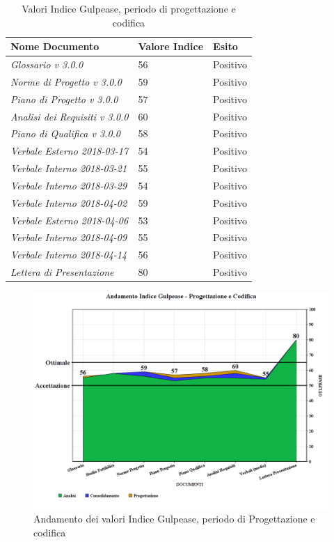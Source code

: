 \documentclass[openany,12pt,a4paper]{report}
\begin{document}
\begin{itemize}
	\begin{table}[h]
		\begin{center}
			\setlength\LTleft{6mm}
			\begin{longtable}{|p{60mm}|p{30mm}|p{25mm}|}
				\hline  
				\textbf{Nome Documento} & \textbf{Valore Indice} & \textbf{Esito} \\ \hline    
				\textit{Glossario v 3.0.0} & 56 & Positivo\\ \hline    
				\textit{Norme di Progetto v 3.0.0} & 59 & Positivo\\ \hline    
				\textit{Piano di Progetto v 3.0.0} & 57 & Positivo\\ \hline    
				\textit{Analisi dei Requisiti v 3.0.0} & 60 & Positivo\\ \hline    
				\textit{Piano di Qualifica v 3.0.0} & 58 & Positivo\\ \hline    
				\textit{Verbale Esterno 2018-03-17} & 54 & Positivo\\ \hline
				\textit{Verbale Interno 2018-03-21} & 55 & Positivo\\ \hline
				\textit{Verbale Interno 2018-03-29} & 54 & Positivo\\ \hline
				\textit{Verbale Interno 2018-04-02} & 59 & Positivo\\ \hline
				\textit{Verbale Esterno 2018-04-06} & 53 & Positivo\\ \hline    
				\textit{Verbale Interno 2018-04-09} & 55 & Positivo\\ \hline
				\textit{Verbale Interno 2018-04-14} & 56 & Positivo\\ \hline
				\textit{Lettera di Presentazione} & 80 & Positivo\\ \hline
			\end{longtable}
		\end{center}
		\caption{Valori Indice Gulpease, periodo di progettazione e codifica} 
	\end{table} 
	
	\begin{figure}[H]
		\includegraphics[scale=0.5]{verifica-progettazione-gulpease}
		\centering
		\caption{Andamento dei valori Indice Gulpease, periodo di Progettazione e codifica}
	\end{figure}
	

\end{itemize}
\end{document}
